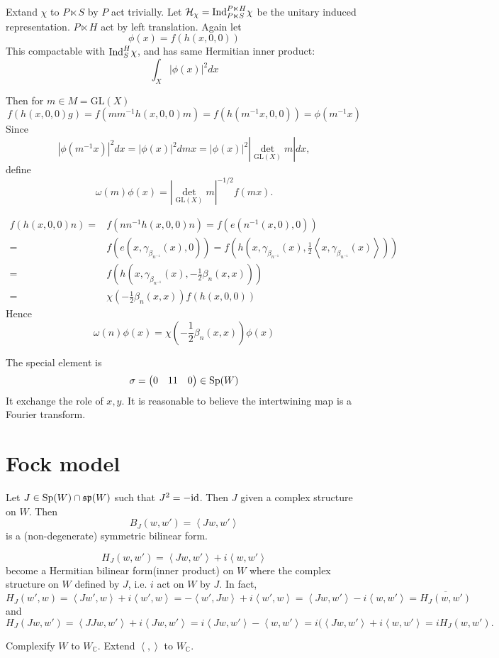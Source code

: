 \documentclass[12pt]{amsart}
\def\Ind{{\rm Ind}}
\def\bC{{\mathbb{C}}}
\def\sp{{\mathfrak{sp}}}
\def\id{{\rm id}}
\def\inn#1#2{\left\langle{#1},{#2}\right\rangle}
\def\abs#1{\left|{#1}\right|}
\def\Sp{{\rm Sp}}
\def\chh{\mathcal{H}}
\def\GL{\mathrm{GL}}
\begin{document}
Extand $\chi$ to $P\ltimes S$ by $P$ act trivially. 
Let $\chh_\chi = \Ind_{P\ltimes S}^{P\ltimes H}\chi$ be the unitary 
induced representation. $P\ltimes H$ act by left translation.
Again let 
\[
\phi(x) = f(h(x,0,0))
\]
This compactable with $\Ind_S^H \chi$, and has same Hermitian inner product:
\[
\int_{X}\abs{\phi(x)}^2 dx 
\]

Then for $m\in M=\GL(X)$
\[
f(h(x,0,0)g)=f(m m^{-1}h(x,0,0)m) = f(h(m^{-1}x,0,0))  = \phi(m^{-1}x)
\]
Since 
\[
|\phi(m^{-1}x)|^2 dx = |\phi(x)|^2 d mx = |\phi(x)|^2 \abs{\det_{\GL(X)} m} dx,
\]
define 
\[
\omega(m)\phi(x) = \abs{\det_{\GL(X)} m}^{-1/2}f(mx).
\]

\[
\begin{split}
f(h(x,0,0)n) =& f(n n^{-1}h(x,0,0)n) = f(e(n^{-1}(x,0),0)) \\
=& f(e(x,\gamma_{\beta_{n^{-1}}}(x),0)) = 
f(h(x, \gamma_{\beta_{n^{-1}}}(x), \frac{1}{2}\inn{x}{\gamma_{\beta_{n^{-1}}}(x)}))\\
=& f(h(x, \gamma_{\beta_{n^{-1}}}(x),  -\frac{1}{2}\beta_n(x,x))) \\
=& \chi(-\frac{1}{2}\beta_n(x,x))f(h(x,0,0))
\end{split}
\]
Hence 
\[
\omega(n)\phi(x) = \chi(-\frac{1}{2}\beta_n(x,x))\phi(x)
\]

The special element is 
\[
\sigma = \begin{pmatrix}
0 & 1
1 & 0
\end{pmatrix} \in \Sp(W)
\]
It exchange the role of $x, y$. It is reasonable to believe the intertwining
map is a Fourier transform. 


\section{Fock model}
Let $J\in \Sp(W)\cap \sp(W)$ such that $J^2 = -\id$.
Then $J$ given a complex structure on $W$.
Then 
\[
B_J(w,w') = \inn{Jw}{w'}
\]
is a (non-degenerate) symmetric bilinear form.

\[
H_J(w,w') = \inn{Jw}{w'} + i\inn{w}{w'}
\]
become a Hermitian bilinear form(inner product) on $W$ where the 
complex structure on $W$ defined by $J$, i.e. $i$ act on $W$ by $J$. 
In fact,
\[
H_J(w',w) = \inn{Jw'}{w} + i \inn{w'}{w} = -\inn{w'}{Jw} + i\inn{w'}{w}
= \inn{Jw}{w'} - i \inn{w}{w'}= \overline{H_J(w,w')}
\]
and
\[
H_J(Jw,w') = \inn{JJw}{w'} + i\inn{Jw}{w'} = i\inn{Jw}{w'} - \inn{w}{w'} 
= i(\inn{Jw}{w'} + i\inn{w}{w'} = i H_J(w,w').
\]

Complexify $W$ to $W_\bC$. Extend $\inn{}{}$ to $W_\bC$.  
 
\end{document}
